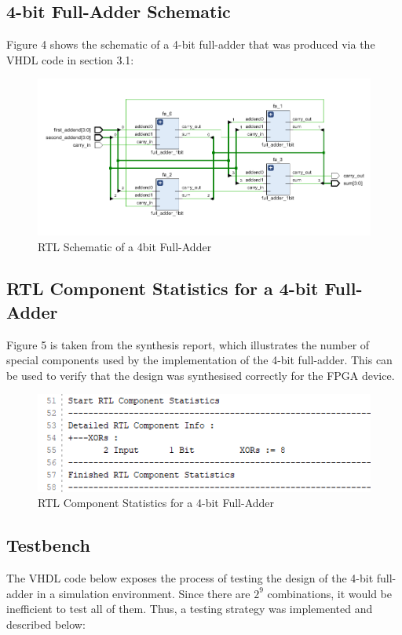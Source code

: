 \documentclass[11pt]{article}
\begin{document}
\subsection{4-bit Full-Adder Schematic}
Figure 4 shows the schematic of a 4-bit full-adder that was produced via the VHDL code in section 3.1:
\begin{figure}[ht]
    \centering
    \includegraphics[width=1.0 \textwidth]{rtl_schematic.png}
    \caption{RTL Schematic of a 4bit Full-Adder}
    \label{fig:isa}
\end{figure}

\subsection {RTL Component Statistics for a 4-bit Full-Adder }

Figure 5 is taken from the synthesis report, which illustrates the number of special components used by the implementation of the 4-bit full-adder. This can be used to verify that the design was synthesised correctly for the FPGA device.



\hspace{5mm}

\begin{figure}[ht]
    \centering
    \includegraphics[width=0.7 \textwidth]{rtl_component_statistics.png}
    \caption{RTL Component Statistics for a 4-bit Full-Adder}
    \label{fig:isa}
\end{figure}
\newpage


\subsection {Testbench}
The VHDL code below exposes the process of testing the design of the 4-bit full-adder in a simulation environment. Since there are $2^9$ combinations, it would be inefficient to test all of them. Thus, a testing strategy was implemented and described below:
\end{document}
